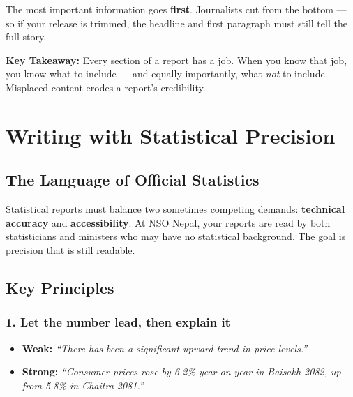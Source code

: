 \documentclass[11pt,a4paper,oneside]{book}
\begin{document}
\begin{tcolorbox}[nsolightbox, colframe=nsored, title=\textbf{Golden Rule for Press Releases}]
    The most important information goes \textbf{first}. Journalists cut from the bottom --- so if your release is trimmed, the headline and first paragraph must still tell the full story.
\end{tcolorbox}

\begin{tcolorbox}[nsolightbox]
\textbf{Key Takeaway:} Every section of a report has a job. When you know that job, you know what to include --- and equally importantly, what \emph{not} to include. Misplaced content erodes a report's credibility.
\end{tcolorbox}


\chapter{Writing with Statistical Precision}

\section{The Language of Official Statistics}

Statistical reports must balance two sometimes competing demands: \textbf{technical accuracy} and \textbf{accessibility}. At NSO Nepal, your reports are read by both statisticians and ministers who may have no statistical background. The goal is precision that is still readable.

\section{Key Principles}

\subsection*{1. Let the number lead, then explain it}

\begin{itemize}
    \item \textbf{Weak:} \emph{``There has been a significant upward trend in price levels.''}
    \item \textbf{Strong:} \emph{``Consumer prices rose by 6.2\% year-on-year in Baisakh 2082, up from 5.8\% in Chaitra 2081.''}
\end{itemize}
\end{document}
